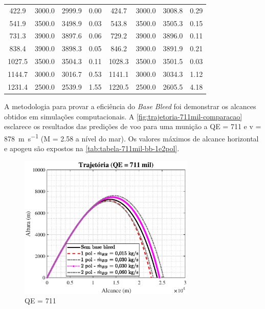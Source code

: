 \begin{table}[ht]
{\begin{tabular}{c|c|c|c|c|c|c|c}
        \num{422,9} & \num{3000,0} & \num{2999,9} & \num{0,00} & \num{424,7} & \num{3000,0} & \num{3008,8} & \num{0,29} \\
        \num{541,9} & \num{3500,0} & \num{3498,9} & \num{0,03} & \num{543,8} & \num{3500,0} & \num{3505,3} & \num{0,15} \\
        \num{731,3} & \num{3900,0} & \num{3897,6} & \num{0,06} & \num{729,2} & \num{3900,0} & \num{3896,0} & \num{0,11} \\
        \num{838,4} & \num{3900,0} & \num{3898,3} & \num{0,05} & \num{846,2} & \num{3900,0} & \num{3891,9} & \num{0,21} \\
        \num{1027,5} & \num{3500,0} & \num{3504,3} & \num{0,11} & \num{1028,3} & \num{3500,0} & \num{3501,5} & \num{0,03} \\
        \num{1144,7} & \num{3000,0} & \num{3016,7} & \num{0,53} & \num{1141,1} & \num{3000,0} & \num{3034,3} & \num{1,12} \\
        \num{1231,4} & \num{2500,0} & \num{2539,9} & \num{1,55} & \num{1220,5} & \num{2500,0} & \num{2605,5} & \num{4,18} \\ 
        \hline
    \end{tabular}%
    }
    \label{tab:tabela-validacao-PRODAS-e-tabelaS-de-tiro-M107}
\end{table}

A metodologia para provar a eficiência do \textit{Base Bleed} foi demonstrar os alcances obtidos em simulações computacionais. A \autoref{fig:trajetoria-711mil-comparacao} esclarece os resultados das predições de voo para uma munição a QE = \qty{711}{\milliradian} e v = \qty{878}{\metre\per\second} (M = \num{2,58} a nível do mar). Os valores máximos de alcance horizontal e apogeu são expostos na  \autoref{tab:tabela-711mil-bb-1e2pol}.

\begin{figure}[!htpb]
	\centering
    \includegraphics[width=0.75\textwidth]{foto1-qe711mil-comparacao.eps}
    \caption[QE = \qty{711}{\milliradian}]{QE = \qty{711}{\milliradian}}
    \label{fig:trajetoria-711mil-comparacao}
\end{figure}

